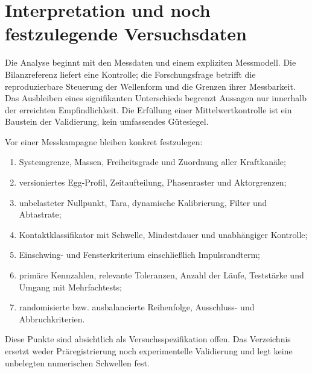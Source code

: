 \documentclass[11pt,a4paper]{article}
\begin{document}
\section{Interpretation und noch festzulegende Versuchsdaten}
Die Analyse beginnt mit den Messdaten und einem expliziten Messmodell. Die Bilanzreferenz liefert eine Kontrolle; die Forschungsfrage betrifft die reproduzierbare Steuerung der Wellenform und die Grenzen ihrer Messbarkeit. Das Ausbleiben eines signifikanten Unterschieds begrenzt Aussagen nur innerhalb der erreichten Empfindlichkeit. Die Erfüllung einer Mittelwertkontrolle ist ein Baustein der Validierung, kein umfassendes Gütesiegel.

Vor einer Messkampagne bleiben konkret festzulegen:
\begin{enumerate}
\item Systemgrenze, Massen, Freiheitsgrade und Zuordnung aller Kraftkanäle;
\item versioniertes Egg-Profil, Zeitaufteilung, Phasenraster und Aktorgrenzen;
\item unbelasteter Nullpunkt, Tara, dynamische Kalibrierung, Filter und Abtastrate;
\item Kontaktklassifikator mit Schwelle, Mindestdauer und unabhängiger Kontrolle;
\item Einschwing- und Fensterkriterium einschließlich Impulsrandterm;
\item primäre Kennzahlen, relevante Toleranzen, Anzahl der Läufe, Teststärke und Umgang mit Mehrfachtests;
\item randomisierte bzw. ausbalancierte Reihenfolge, Ausschluss- und Abbruchkriterien.
\end{enumerate}
Diese Punkte sind absichtlich als Versuchsspezifikation offen. Das Verzeichnis ersetzt weder Präregistrierung noch experimentelle Validierung und legt keine unbelegten numerischen Schwellen fest.

\appendix
\end{document}
